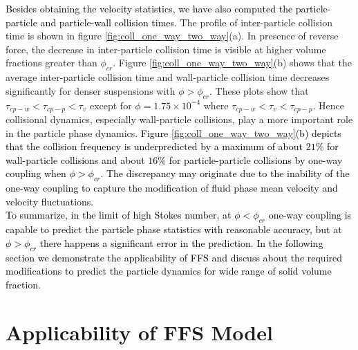 \documentclass[notitlepage]{revtex4-1}
\begin{document}
\textcolor{black}{Besides obtaining the velocity statistics, we have also computed the particle-particle and particle-wall collision times.} The profile of inter-particle collision time is shown in figure \ref{fig:coll_one_way_two_way}(a). In presence of reverse force, the decrease in inter-particle collision time is visible at higher volume fractions greater than $\phi_{cr}$. Figure \ref{fig:coll_one_way_two_way}(b) shows that the average inter-particle collision time and wall-particle collision time decreases significantly for denser suspensions with $\phi>\phi_{cr}$. These plots show that $\tau_{cp-w} < \tau_{cp-p} < \tau_v $ except for $\phi=1.75\times10^{-4}$ where $\tau_{cp-w} < \tau_v< \tau_{cp-p} $. Hence collisional dynamics, especially  wall-particle collisions, play a more important role in the particle phase dynamics. \textcolor{black}{Figure \ref{fig:coll_one_way_two_way}(b) depicts that the collision frequency is underpredicted by a maximum of about $21\%$ for wall-particle collisions and about $16\%$ for particle-particle collisions by one-way coupling when $\phi>\phi_{cr}$. The discrepancy may originate due to the inability of the one-way coupling to capture the modification of fluid phase mean velocity and velocity fluctuations.\\
To summarize, in the limit of high Stokes number, at $\phi<\phi_{cr}$ one-way coupling is capable to predict the particle phase statistics with reasonable accuracy, but at $\phi>\phi_{cr}$ there happens a significant error in the prediction. In the following section we demonstrate the applicability of FFS \citep{goswami2010particle} and discuss about the required modifications to predict the particle dynamics for wide range of solid volume fraction.}  
\section{Applicability of FFS Model}
\label{App_FFS}
\end{document}
